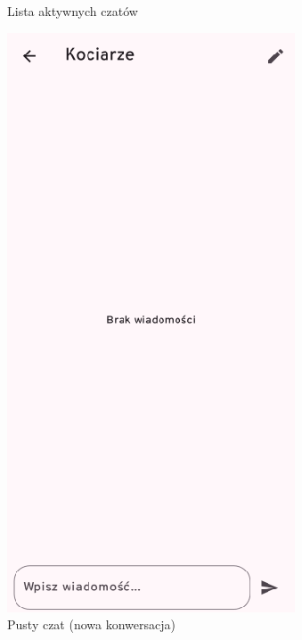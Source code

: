 \begin{figure}[H]
\begin{minipage}[b]{0.45\textwidth}
		\caption{Lista aktywnych czatów}
	\end{minipage}
	\hfill
	\begin{minipage}[b]{0.45\textwidth}
		\centering
		\includegraphics[width=\textwidth]{root/raptchat_empty_chat.png}
		\caption{Pusty czat (nowa konwersacja)}
	\end{minipage}
\end{figure}


